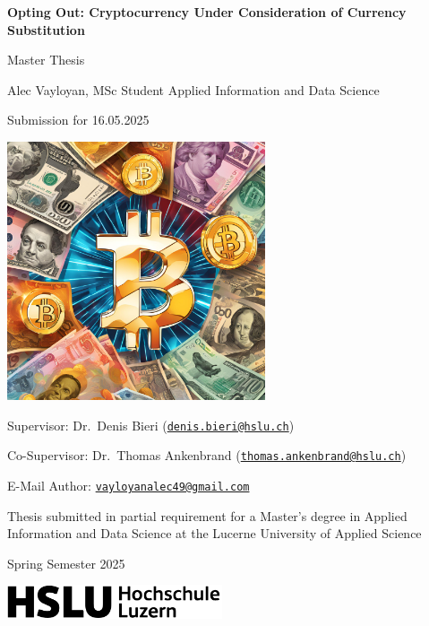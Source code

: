 \documentclass[
]{article}
\author{}
\date{\vspace{-2.5em}}
\begin{document}
\thispagestyle{empty} %
\centering
\LARGE

\textbf{Opting Out: Cryptocurrency Under Consideration of Currency Substitution}

\large

Master Thesis

\large

Alec Vayloyan, MSc Student Applied Information and Data Science

\large

Submission for 16.05.2025

\includegraphics[width=3in]{cover.png} \large

Supervisor: Dr.~Denis Bieri (\href{mailto:denis.bieri@hslu.ch}{\nolinkurl{denis.bieri@hslu.ch}})

Co-Supervisor: Dr.~Thomas Ankenbrand (\href{mailto:thomas.ankenbrand@hslu.ch}{\nolinkurl{thomas.ankenbrand@hslu.ch}})

E-Mail Author: \href{mailto:vayloyanalec49@gmail.com}{\nolinkurl{vayloyanalec49@gmail.com}}

Thesis submitted in partial requirement for a Master's degree in Applied Information and Data Science at the Lucerne University of Applied Science

Spring Semester 2025 \vspace{2cm}

\begin{flushleft}

\includegraphics[width=2.5in]{hslu_logo.png}

\end{flushleft}
\pagestyle{roman}
\newpage
\end{document}
